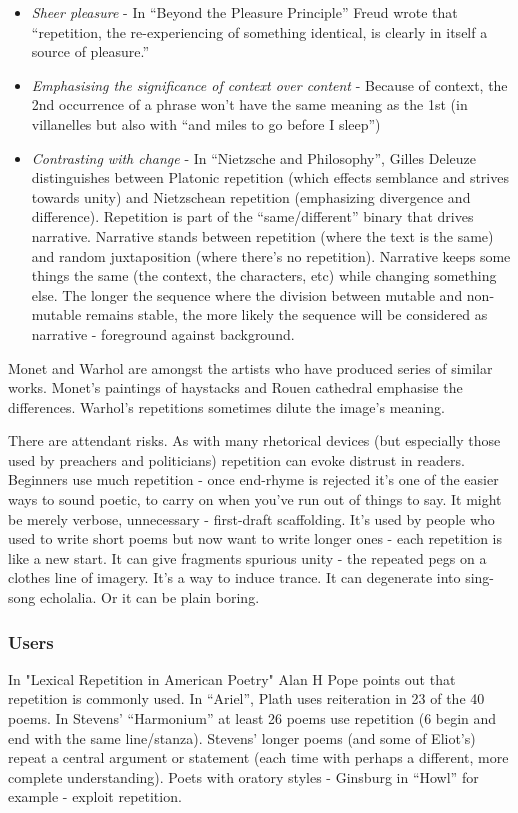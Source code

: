 \documentclass[11pt]{article}
\begin{document}
\begin{itemize}
\item \textit{Sheer pleasure} - In ``Beyond the Pleasure Principle'' Freud wrote that ``repetition, the re-experiencing of something identical, is clearly in itself a source of pleasure.''

\item \textit{Emphasising the significance of context over content} - Because of context, the 2nd occurrence of a phrase won't have the same meaning as the 1st (in villanelles but also with ``and miles to go before I sleep'')
\item \textit{Contrasting with change} - In ``Nietzsche and Philosophy'', Gilles Deleuze distinguishes between Platonic repetition (which effects semblance and strives towards unity) and Nietzschean repetition (emphasizing divergence and difference). Repetition is part of the ``same/different'' binary that drives narrative. Narrative stands between repetition (where the text is the same) and random juxtaposition (where there's no repetition). Narrative keeps some things the same (the context, the characters, etc) while changing something else. The longer the sequence where the division between mutable and non-mutable remains stable, the more likely the sequence will be considered as narrative - foreground against background.
\end{itemize}

Monet and Warhol are amongst the artists who have produced series of similar works. Monet's paintings of haystacks and Rouen cathedral emphasise the differences. Warhol's repetitions sometimes dilute the image's meaning.

There are attendant risks. As with many rhetorical devices (but especially those used by preachers and politicians) repetition can evoke distrust in readers. Beginners use much repetition - once end-rhyme is rejected it's one of the easier ways to sound poetic, to carry on when you've run out of things to say. It might be merely verbose, unnecessary - first-draft scaffolding. It's used by people who used to write short poems but now want to write longer ones - each repetition is like a new start. It can give fragments spurious unity - the repeated pegs on a clothes line of imagery. It's a way to induce trance. It can degenerate into sing-song echolalia. Or it can be plain boring. 

\subsubsection*{Users}
In "Lexical Repetition in American Poetry" Alan H Pope points out that repetition is commonly used. In ``Ariel'', Plath uses reiteration in 23 of the 40 poems. In Stevens' ``Harmonium'' at least 26 poems use repetition (6 begin and end with the same line/stanza). Stevens' longer poems (and some of Eliot's) repeat a central argument or statement (each time with perhaps a different, more complete understanding).  Poets with oratory styles - Ginsburg in ``Howl'' for example - exploit repetition.
\end{document}
